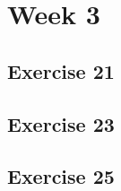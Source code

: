 \documentclass[a4paper]{article}
\let\stdsection\section
\renewcommand\section{\newpage\stdsection}
\begin{document}
\section*{Week 3}

\subsection*{Exercise 21}


\newpage
\subsection*{Exercise 23}










\newpage
\subsection*{Exercise 25}




\end{document}
